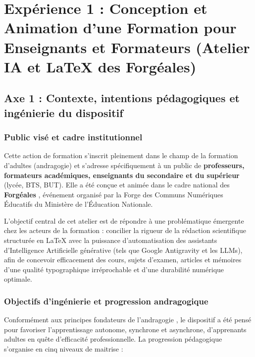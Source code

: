 \chapter{Expérience 1 : Conception et Animation d'une Formation pour Enseignants et Formateurs (Atelier IA et \LaTeX{} des Forgéales)}

\section{Axe 1 : Contexte, intentions pédagogiques et ingénierie du dispositif}

\subsection{Public visé et cadre institutionnel}

Cette action de formation s'inscrit pleinement dans le champ de la formation d'adultes (andragogie) et s'adresse spécifiquement à un public de \textbf{professeurs, formateurs académiques, enseignants du secondaire et du supérieur} (lycée, BTS, BUT). Elle a été conçue et animée dans le cadre national des \textbf{Forgéales} \parencite{forge_educative}, événement organisé par la Forge des Communs Numériques Éducatifs du Ministère de l'Éducation Nationale.

L'objectif central de cet atelier est de répondre à une problématique émergente chez les acteurs de la formation : concilier la rigueur de la rédaction scientifique structurée en \LaTeX{} avec la puissance d'automatisation des assistants d'Intelligence Artificielle générative (tels que Google Antigravity et les LLMs), afin de concevoir efficacement des cours, sujets d'examen, articles et mémoires d'une qualité typographique irréprochable et d'une durabilité numérique optimale.

\subsection{Objectifs d'ingénierie et progression andragogique}

Conformément aux principes fondateurs de l'andragogie \parencite{knowles_andragogy}, le dispositif a été pensé pour favoriser l'apprentissage autonome, synchrone et asynchrone, d'apprenants adultes en quête d'efficacité professionnelle. La progression pédagogique s'organise en cinq niveaux de maitrise :

